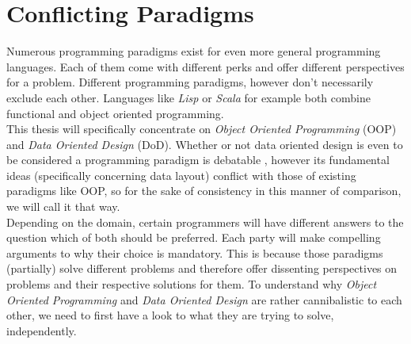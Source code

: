 \chapter{Conflicting Paradigms}
Numerous programming paradigms exist for even more general programming languages. Each of them come with different perks and offer different perspectives for a problem. Different programming paradigms, however don't necessarily exclude each other. Languages like \textit{Lisp} or \textit{Scala} for example both combine functional and object oriented programming.\\
This thesis will specifically concentrate on \textit{Object Oriented Programming} (OOP) and \textit{Data Oriented Design} (DoD). Whether or not data oriented design is even to be considered a programming paradigm is debatable , however its fundamental ideas (specifically concerning data layout) conflict with those of existing paradigms like OOP, so for the sake of consistency in this manner of comparison, we will call it that way.\\ 
Depending on the domain, certain programmers will have different answers to the question which of both should be preferred. Each party will make compelling arguments to why their choice is mandatory. This is because those paradigms (partially) solve different problems and therefore offer dissenting perspectives on problems and their respective solutions for them.
To understand why \textit{Object Oriented Programming} and \textit{Data Oriented Design} are rather cannibalistic to each other, we need to first have a look to what they are trying to solve, independently.

